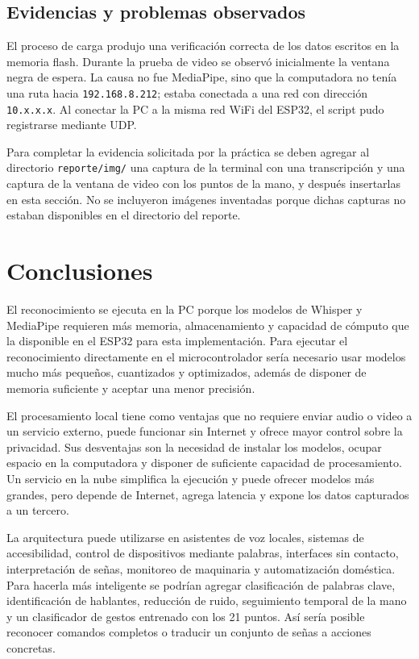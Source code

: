 \documentclass[12pt, letterpaper]{article}
\begin{document}
\subsection*{\fontsize{12}{17}\selectfont Evidencias y problemas observados}

El proceso de carga produjo una verificación correcta de los datos escritos en
la memoria flash. Durante la prueba de video se observó inicialmente la ventana
negra de espera. La causa no fue MediaPipe, sino que la computadora no tenía
una ruta hacia \texttt{192.168.8.212}; estaba conectada a una red con dirección
\texttt{10.x.x.x}. Al conectar la PC a la misma red WiFi del ESP32, el script
pudo registrarse mediante UDP.

Para completar la evidencia solicitada por la práctica se deben agregar al
directorio \texttt{reporte/img/} una captura de la terminal con una
transcripción y una captura de la ventana de video con los puntos de la mano, y
después insertarlas en esta sección. No se incluyeron imágenes inventadas
porque dichas capturas no estaban disponibles en el directorio del reporte.

\section*{\centering \fontsize{14}{17}\sffamily\selectfont Conclusiones}

El reconocimiento se ejecuta en la PC porque los modelos de Whisper y MediaPipe
requieren más memoria, almacenamiento y capacidad de cómputo que la disponible
en el ESP32 para esta implementación. Para ejecutar el reconocimiento
directamente en el microcontrolador sería necesario usar modelos mucho más
pequeños, cuantizados y optimizados, además de disponer de memoria suficiente y
aceptar una menor precisión.

El procesamiento local tiene como ventajas que no requiere enviar audio o video
a un servicio externo, puede funcionar sin Internet y ofrece mayor control
sobre la privacidad. Sus desventajas son la necesidad de instalar los modelos,
ocupar espacio en la computadora y disponer de suficiente capacidad de
procesamiento. Un servicio en la nube simplifica la ejecución y puede ofrecer
modelos más grandes, pero depende de Internet, agrega latencia y expone los
datos capturados a un tercero.

La arquitectura puede utilizarse en asistentes de voz locales, sistemas de
accesibilidad, control de dispositivos mediante palabras, interfaces sin
contacto, interpretación de señas, monitoreo de maquinaria y automatización
doméstica. Para hacerla más inteligente se podrían agregar clasificación de
palabras clave, identificación de hablantes, reducción de ruido, seguimiento
temporal de la mano y un clasificador de gestos entrenado con los 21 puntos.
Así sería posible reconocer comandos completos o traducir un conjunto de señas
a acciones concretas.

% 
\end{document}
